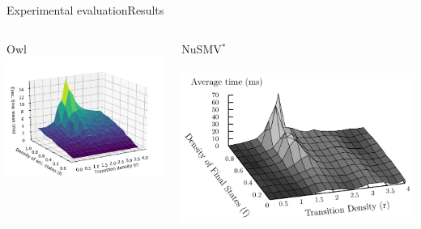 \documentclass[10pt]{beamer}
\begin{document}
\begin{frame}{Experimental evaluation}{Results}
  \begin{columns}[T]
   \begin{column}{.5\textwidth}
       \begin{block}{Owl}
       \includegraphics[scale=0.4]{img/defense/with-hashmap-exp5}
       \end{block}
     \end{column}
     \begin{column}{.5\textwidth}
         \begin{block}{NuSMV$^*$}
           \\~\\
            \includegraphics[scale=0.2]{img/defense/original-average-antichain}
         \end{block}
     \end{column}
 \end{columns}
\end{frame}
\end{document}
